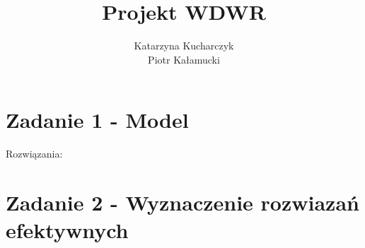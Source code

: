 \documentclass[a4paper,11pt]{report}
\title{Projekt WDWR}
\author{Katarzyna Kucharczyk\\
Piotr Kałamucki}
\begin{document}
\maketitle

\chapter{Zadanie 1 - Model}


Rozwiązania:

\chapter{Zadanie 2 - Wyznaczenie rozwiazań efektywnych}
\end{document}
